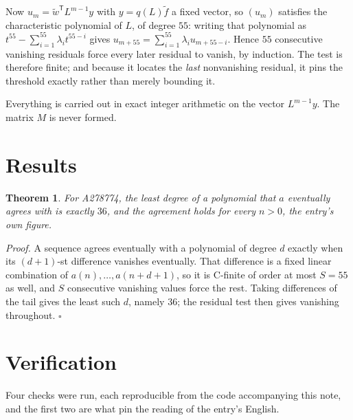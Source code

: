 \documentclass[11pt]{article}
\newtheorem{theorem}{Theorem}
\theoremstyle{definition}
\begin{document}
Now $u_m = \tilde w^{\mathsf T} L^{m-1} y$ with $y = q(L)\tilde f$ a fixed vector, so $(u_m)$ satisfies the characteristic polynomial of $L$, of degree $55$: writing that polynomial as $t^{55} - \sum_{i=1}^{55} \lambda_i t^{55-i}$ gives $u_{m+55} = \sum_{i=1}^{55} \lambda_i u_{m+55-i}$. Hence $55$ consecutive vanishing residuals force every later residual to vanish, by induction. The test is therefore finite; and because it locates the {\itshape last} nonvanishing residual, it pins the threshold exactly rather than merely bounding it.

Everything is carried out in exact integer arithmetic on the vector $L^{m-1}y$. The matrix $M$ is never formed.

\section{Results}

\begin{theorem} For A278774, the least degree of a polynomial that $a$ eventually agrees with is exactly $36$, and the agreement holds for every $n > 0$, the entry's own figure.\end{theorem}

{\itshape Proof.} A sequence agrees eventually with a polynomial of degree $d$ exactly when its $(d+1)$-st difference vanishes eventually. That difference is a fixed linear combination of $a(n),\dots,a(n+d+1)$, so it is C-finite of order at most $S = 55$ as well, and $S$ consecutive vanishing values force the rest. Taking differences of the tail gives the least such $d$, namely $36$; the residual test then gives vanishing throughout. $\square$

\section{Verification}

Four checks were run, each reproducible from the code accompanying this note, and the first two are what pin the reading of the entry's English.
\end{document}

